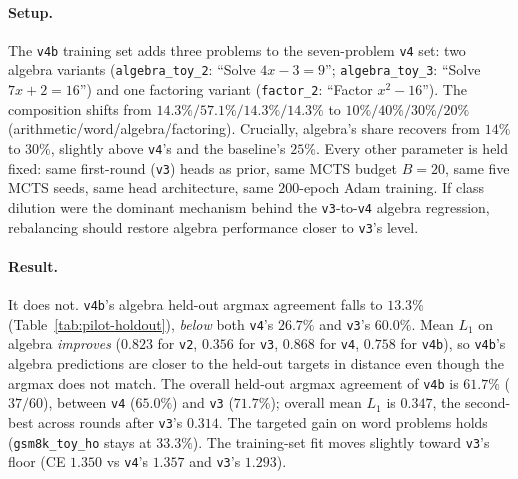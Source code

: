 \paragraph{Setup.} The \texttt{v4b} training set adds three problems
to the seven-problem \texttt{v4} set: two algebra variants
(\texttt{algebra\_toy\_2}: ``Solve $4x - 3 = 9$''; \texttt{algebra\_toy\_3}:
``Solve $7x + 2 = 16$'') and one factoring variant
(\texttt{factor\_2}: ``Factor $x^2 - 16$''). The composition shifts
from $14.3\%/57.1\%/14.3\%/14.3\%$ to
$10\%/40\%/30\%/20\%$ (arithmetic/word/algebra/factoring). Crucially,
algebra's share recovers from $14\%$ to $30\%$, slightly above
\texttt{v4}'s and the baseline's $25\%$. Every other parameter is
held fixed: same first-round (\texttt{v3}) heads as prior, same MCTS
budget $B = 20$, same five MCTS seeds, same head architecture, same
$200$-epoch Adam training. If class dilution were the dominant
mechanism behind the \texttt{v3}-to-\texttt{v4} algebra regression,
rebalancing should restore algebra performance closer to
\texttt{v3}'s level.

\paragraph{Result.} It does not. \texttt{v4b}'s algebra held-out
argmax agreement falls to $13.3\%$
(Table~\ref{tab:pilot-holdout}), \emph{below} both \texttt{v4}'s
$26.7\%$ and \texttt{v3}'s $60.0\%$. Mean $L_1$ on algebra
\emph{improves} ($0.823$ for \texttt{v2}, $0.356$ for \texttt{v3},
$0.868$ for \texttt{v4}, $0.758$ for \texttt{v4b}), so
\texttt{v4b}'s algebra predictions are closer to the held-out
targets in distance even though the argmax does not match. The
overall held-out argmax agreement of \texttt{v4b} is $61.7\%$
($37/60$), between \texttt{v4} ($65.0\%$) and \texttt{v3} ($71.7\%$);
overall mean $L_1$ is $0.347$, the second-best across rounds after
\texttt{v3}'s $0.314$. The targeted gain on word problems holds
(\texttt{gsm8k\_toy\_ho} stays at $33.3\%$). The training-set fit
moves slightly toward \texttt{v3}'s floor (CE $1.350$ vs \texttt{v4}'s
$1.357$ and \texttt{v3}'s $1.293$).

